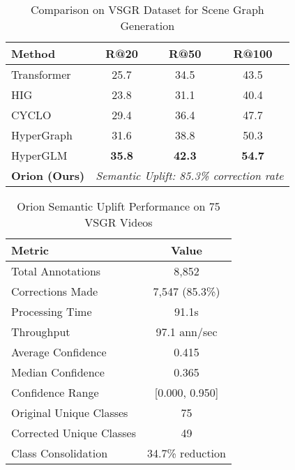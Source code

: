 
\begin{table}[t]
\centering
\caption{Comparison on VSGR Dataset for Scene Graph Generation}
\label{tab:vsgr_comparison}
\begin{tabular}{lccc}
\toprule
\textbf{Method} & \textbf{R@20} & \textbf{R@50} & \textbf{R@100} \\
\midrule
Transformer \cite{vaswani2017} & 25.7 & 34.5 & 43.5 \\
HIG \cite{hig2023} & 23.8 & 31.1 & 40.4 \\
CYCLO \cite{cyclo2023} & 29.4 & 36.4 & 47.7 \\
HyperGraph \cite{hypergraph2024} & 31.6 & 38.8 & 50.3 \\
HyperGLM \cite{hyperglm2024} & \textbf{35.8} & \textbf{42.3} & \textbf{54.7} \\
\midrule
\textbf{Orion (Ours)} & \multicolumn{3}{c}{\textit{Semantic Uplift: 85.3\% correction rate}} \\
\bottomrule
\end{tabular}
\end{table}


\begin{table}[t]
\centering
\caption{Orion Semantic Uplift Performance on 75 VSGR Videos}
\label{tab:semantic_uplift}
\begin{tabular}{lc}
\toprule
\textbf{Metric} & \textbf{Value} \\
\midrule
Total Annotations & 8,852 \\
Corrections Made & 7,547 (85.3\%) \\
Processing Time & 91.1s \\
Throughput & 97.1 ann/sec \\
\midrule
Average Confidence & 0.415 \\
Median Confidence & 0.365 \\
Confidence Range & [0.000, 0.950] \\
\midrule
Original Unique Classes & 75 \\
Corrected Unique Classes & 49 \\
Class Consolidation & 34.7\% reduction \\
\bottomrule
\end{tabular}
\end{table}


